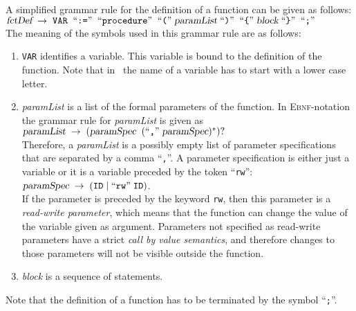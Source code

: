 \noindent
A simplified grammar rule for the definition of a function can be given as follows:
\\[0.2cm]
\hspace*{1.3cm}
$\textsl{fctDef} \;\rightarrow\; \mathtt{VAR}\; \;\mbox{``\texttt{:=}''}\; \;\mbox{``\texttt{procedure}''}\; \;\mbox{``\texttt{(}''}\; \textsl{paramList} 
 \;\mbox{``\texttt{)}''}\; \;\mbox{``\texttt{\{}''}\; \textsl{block} \;\mbox{``\texttt{\}}''}\; \;\mbox{``\texttt{;}''}\;$
\\[0.2cm]
The meaning of the symbols used in this grammar rule are as follows:
\begin{enumerate}
\item \texttt{VAR} identifies a variable.  This variable is bound to the definition of the function.
      Note that in \setlx\ the name of a variable has to start with a lower case letter.
\item \textsl{paramList} is a list of the formal parameters of the function.  In
      \textsc{Ebnf}-notation the grammar rule for \textsl{paramList} is given as
      \\[0.2cm]
      \hspace*{1.3cm}
      $\textsl{paramList} \;\rightarrow\; (\textsl{paramSpec}\;\; (\mbox{``\texttt{,}''}\; \textsl{paramSpec})^*)?$
      \\[0.2cm]
      Therefore, a \textsl{paramList} is a possibly empty list of parameter specifications that are 
      separated by a comma ``\texttt{,}''.  A parameter specification is either just a variable
      or it is a variable preceded by the token ``\texttt{rw}'':
      \\[0.2cm]
      \hspace*{1.3cm}
      $\textsl{paramSpec} \;\rightarrow\; (\mathtt{ID} \mid \mbox{``\texttt{rw}''}\; \mathtt{ID})$.
      \\[0.2cm]  
      If the parameter is preceded by the keyword \texttt{rw}, then this parameter is a 
      \emph{read-write parameter}, which means that the function can change the value of the
      variable given as argument.  Parameters not specified as read-write parameters have a strict
      \emph{call by value semantics}, and therefore changes to those parameters will not be
      visible outside the function.
\item \textsl{block} is a sequence of statements.
\end{enumerate}
Note that the definition of a function has to be terminated by the symbol ``\texttt{;}''.

